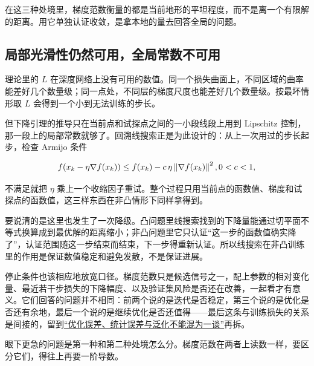 在这三种处境里，梯度范数衡量的都是当前地形的平坦程度，而不是离一个有限解的距离。用它单独认证收敛，是拿本地的量去回答全局的问题。

\subsection{局部光滑性仍然可用，全局常数不可用}

理论里的 \(L\) 在深度网络上没有可用的数值。同一个损失曲面上，不同区域的曲率能差好几个数量级；同一点处，不同层的梯度尺度也能差好几个数量级。按最坏情形取 \(L\) 会得到一个小到无法训练的步长。

但下降引理的推导只在当前点和试探点之间的一小段线段上用到 Lipschitz 控制，那一段上的局部常数就够了。回溯线搜索正是为此设计的：从上一次用过的步长起步，检查 Armijo 条件

\[
f(x_k-\eta\nabla f(x_k))\le f(x_k)-c\,\eta\left\lVert\nabla f(x_k)\right\rVert^2 ,\space 0<c<1 ,
\]

不满足就把 \(\eta\) 乘上一个收缩因子重试。整个过程只用当前点的函数值、梯度和试探点的函数值，这三样东西在非凸情形下同样拿得到。

要说清的是这里也发生了一次降级。凸问题里线搜索找到的下降量能通过切平面不等式换算成到最优解的距离缩小；非凸问题里它只认证``这一步的函数值确实降了''，认证范围随这一步结束而结束，下一步得重新认证。所以线搜索在非凸训练里的作用是保证数值稳定和避免发散，不是保证进展。

停止条件也该相应地放宽口径。梯度范数只是候选信号之一，配上参数的相对变化量、最近若干步损失的下降幅度、以及验证集风险是否还在改善，一起看才有意义。它们回答的问题并不相同：前两个说的是迭代是否稳定，第三个说的是优化是否还有余地，最后一个说的是继续优化是否还值得——最后这条与训练损失的关系是间接的，留到\hyperref[sec:09-Convex-Optimization/08-Nonconvex-and-Stochastic-Optimization/06]{``优化误差、统计误差与泛化不能混为一谈''}再拆。

眼下更急的问题是第一种和第二种处境怎么分。梯度范数在两者上读数一样，要区分它们，得往上再要一阶导数。
